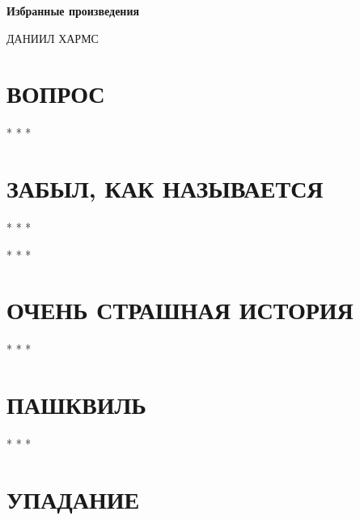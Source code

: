 \documentclass[a4paper,12pt]{article}
\begin{document}
\begin{center}
{\Large\bfseries Избранные произведения}
\end{center}

\vspace{0.5cm}

\begin{center}
{\large ДАНИИЛ ХАРМС}
\end{center}

\vspace{0.5cm}

\section{ВОПРОС}

\vspace{0.5cm}

\begin{center}
* * *
\end{center}
\section{ЗАБЫЛ, КАК НАЗЫВАЕТСЯ}


\vspace{0.5cm}

\begin{center}
* * *
\end{center}

\vspace{0.5cm}

\vspace{0.5cm}

\begin{center}
* * *
\end{center}
\section{ОЧЕНЬ СТРАШНАЯ ИСТОРИЯ}


\vspace{0.5cm}

\begin{center}
* * *
\end{center}
\section{ПАШКВИЛЬ}


\vspace{0.5cm}

\begin{center}
* * *
\end{center}
\section{УПАДАНИЕ}


\end{document}
